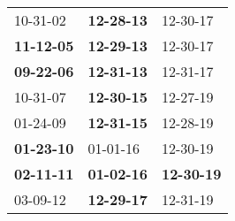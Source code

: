 \begin{supertabular}{p{0.33\columnwidth}p{0.33\columnwidth}p{0.33\columnwidth}}
          10-31-02\textsuperscript{} &  \textbf{12-28-13\textsuperscript{}} &           12-30-17\textsuperscript{} \\
 \textbf{11-12-05\textsuperscript{}} &  \textbf{12-29-13\textsuperscript{}} &           12-30-17\textsuperscript{} \\
 \textbf{09-22-06\textsuperscript{}} &  \textbf{12-31-13\textsuperscript{}} &           12-31-17\textsuperscript{} \\
          10-31-07\textsuperscript{} &  \textbf{12-30-15\textsuperscript{}} &           12-27-19\textsuperscript{} \\
          01-24-09\textsuperscript{} &  \textbf{12-31-15\textsuperscript{}} &           12-28-19\textsuperscript{} \\
 \textbf{01-23-10\textsuperscript{}} &           01-01-16\textsuperscript{} &           12-30-19\textsuperscript{} \\
 \textbf{02-11-11\textsuperscript{}} &  \textbf{01-02-16\textsuperscript{}} &  \textbf{12-30-19\textsuperscript{}} \\
          03-09-12\textsuperscript{} &  \textbf{12-29-17\textsuperscript{}} &           12-31-19\textsuperscript{} \\
\end{supertabular}
